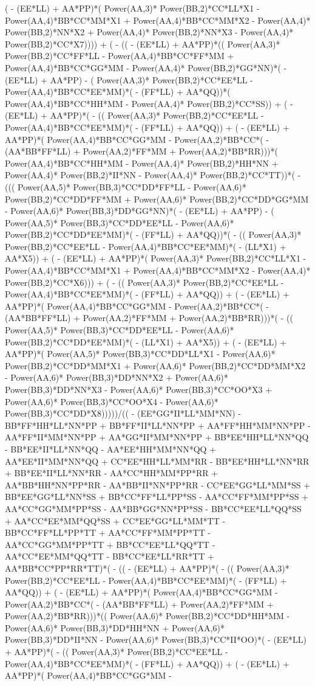 \documentclass[10pt]{article} %
\begin{document}
{( - (EE*LL) + AA*PP)*( Power(AA,3)* Power(BB,2)*CC*LL*X1 -  Power(AA,4)*BB*CC*MM*X1 +  Power(AA,4)*BB*CC*MM*X2 -  Power(AA,4)* Power(BB,2)*NN*X2 +  Power(AA,4)* Power(BB,2)*NN*X3 -  Power(AA,4)* Power(BB,2)*CC*X7)))) + ( - (( - (EE*LL) + AA*PP)*(( Power(AA,3)* Power(BB,2)*CC*FF*LL -  Power(AA,4)*BB*CC*FF*MM +  Power(AA,4)*BB*CC*GG*MM -  Power(AA,4)* Power(BB,2)*GG*NN)*( - (EE*LL) + AA*PP) - ( Power(AA,3)* Power(BB,2)*CC*EE*LL -  Power(AA,4)*BB*CC*EE*MM)*( - (FF*LL) + AA*QQ))*( Power(AA,4)*BB*CC*HH*MM -  Power(AA,4)* Power(BB,2)*CC*SS)) + ( - (EE*LL) + AA*PP)*( - (( Power(AA,3)* Power(BB,2)*CC*EE*LL -  Power(AA,4)*BB*CC*EE*MM)*( - (FF*LL) + AA*QQ)) + ( - (EE*LL) + AA*PP)*( Power(AA,4)*BB*CC*GG*MM -  Power(AA,2)*BB*CC*( - (AA*BB*FF*LL) +  Power(AA,2)*FF*MM +  Power(AA,2)*BB*RR)))*( Power(AA,4)*BB*CC*HH*MM -  Power(AA,4)* Power(BB,2)*HH*NN +  Power(AA,4)* Power(BB,2)*II*NN -  Power(AA,4)* Power(BB,2)*CC*TT))*( - ((( Power(AA,5)* Power(BB,3)*CC*DD*FF*LL -  Power(AA,6)* Power(BB,2)*CC*DD*FF*MM +  Power(AA,6)* Power(BB,2)*CC*DD*GG*MM -  Power(AA,6)* Power(BB,3)*DD*GG*NN)*( - (EE*LL) + AA*PP) - ( Power(AA,5)* Power(BB,3)*CC*DD*EE*LL -  Power(AA,6)* Power(BB,2)*CC*DD*EE*MM)*( - (FF*LL) + AA*QQ))*( - (( Power(AA,3)* Power(BB,2)*CC*EE*LL -  Power(AA,4)*BB*CC*EE*MM)*( - (LL*X1) + AA*X5)) + ( - (EE*LL) + AA*PP)*( Power(AA,3)* Power(BB,2)*CC*LL*X1 -  Power(AA,4)*BB*CC*MM*X1 +  Power(AA,4)*BB*CC*MM*X2 -  Power(AA,4)* Power(BB,2)*CC*X6))) + ( - (( Power(AA,3)* Power(BB,2)*CC*EE*LL -  Power(AA,4)*BB*CC*EE*MM)*( - (FF*LL) + AA*QQ)) + ( - (EE*LL) + AA*PP)*( Power(AA,4)*BB*CC*GG*MM -  Power(AA,2)*BB*CC*( - (AA*BB*FF*LL) +  Power(AA,2)*FF*MM +  Power(AA,2)*BB*RR)))*( - (( Power(AA,5)* Power(BB,3)*CC*DD*EE*LL -  Power(AA,6)* Power(BB,2)*CC*DD*EE*MM)*( - (LL*X1) + AA*X5)) + ( - (EE*LL) + AA*PP)*( Power(AA,5)* Power(BB,3)*CC*DD*LL*X1 -  Power(AA,6)* Power(BB,2)*CC*DD*MM*X1 +  Power(AA,6)* Power(BB,2)*CC*DD*MM*X2 -  Power(AA,6)* Power(BB,3)*DD*NN*X2 +  Power(AA,6)* Power(BB,3)*DD*NN*X3 -  Power(AA,6)* Power(BB,3)*CC*OO*X3 +  Power(AA,6)* Power(BB,3)*CC*OO*X4 -  Power(AA,6)* Power(BB,3)*CC*DD*X8)))))/(( - (EE*GG*II*LL*MM*NN) - BB*FF*HH*LL*NN*PP + BB*FF*II*LL*NN*PP + AA*FF*HH*MM*NN*PP - AA*FF*II*MM*NN*PP + AA*GG*II*MM*NN*PP + BB*EE*HH*LL*NN*QQ - BB*EE*II*LL*NN*QQ - AA*EE*HH*MM*NN*QQ + AA*EE*II*MM*NN*QQ + CC*EE*HH*LL*MM*RR - BB*EE*HH*LL*NN*RR + BB*EE*II*LL*NN*RR - AA*CC*HH*MM*PP*RR + AA*BB*HH*NN*PP*RR - AA*BB*II*NN*PP*RR - CC*EE*GG*LL*MM*SS + BB*EE*GG*LL*NN*SS + BB*CC*FF*LL*PP*SS - AA*CC*FF*MM*PP*SS + AA*CC*GG*MM*PP*SS - AA*BB*GG*NN*PP*SS - BB*CC*EE*LL*QQ*SS + AA*CC*EE*MM*QQ*SS + CC*EE*GG*LL*MM*TT - BB*CC*FF*LL*PP*TT + AA*CC*FF*MM*PP*TT - AA*CC*GG*MM*PP*TT + BB*CC*EE*LL*QQ*TT - AA*CC*EE*MM*QQ*TT - BB*CC*EE*LL*RR*TT + AA*BB*CC*PP*RR*TT)*( - (( - (EE*LL) + AA*PP)*( - (( Power(AA,3)* Power(BB,2)*CC*EE*LL -  Power(AA,4)*BB*CC*EE*MM)*( - (FF*LL) + AA*QQ)) + ( - (EE*LL) + AA*PP)*( Power(AA,4)*BB*CC*GG*MM -  Power(AA,2)*BB*CC*( - (AA*BB*FF*LL) +  Power(AA,2)*FF*MM +  Power(AA,2)*BB*RR)))*(( Power(AA,6)* Power(BB,2)*CC*DD*HH*MM -  Power(AA,6)* Power(BB,3)*DD*HH*NN +  Power(AA,6)* Power(BB,3)*DD*II*NN -  Power(AA,6)* Power(BB,3)*CC*II*OO)*( - (EE*LL) + AA*PP)*( - (( Power(AA,3)* Power(BB,2)*CC*EE*LL -  Power(AA,4)*BB*CC*EE*MM)*( - (FF*LL) + AA*QQ)) + ( - (EE*LL) + AA*PP)*( Power(AA,4)*BB*CC*GG*MM -  }
\end{document}
